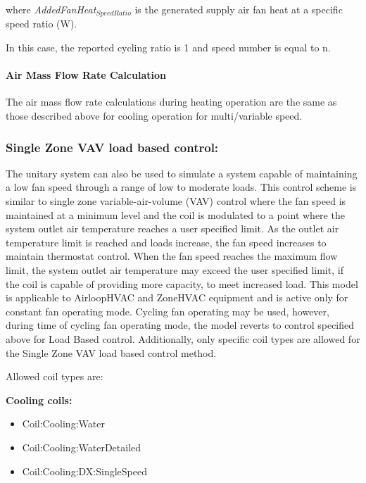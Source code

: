 where \emph{AddedFanHeat\(_{SpeedRatio}\)} is the generated supply air fan heat at a specific speed ratio (W).

In this case, the reported cycling ratio is 1 and speed number is equal to n.

\paragraph{Air Mass Flow Rate Calculation}\label{air-mass-flow-rate-calculation-1}

The air mass flow rate calculations during heating operation are the same as those described above for cooling operation for multi/variable speed.

\subsubsection{Single Zone VAV load based control:}\label{ashrae-901-load-based-control}

The unitary system can also be used to simulate a system capable of maintaining a low fan speed through a range of low to moderate loads. This control scheme is similar to single zone variable-air-volume (VAV) control where the fan speed is maintained at a minimum level and the coil is modulated to a point where the system outlet air temperature reaches a user specified limit. As the outlet air temperature limit is reached and loads increase, the fan speed increases to maintain thermostat control. When the fan speed reaches the maximum flow limit, the system outlet air temperature may exceed the user specified limit, if the coil is capable of providing more capacity, to meet increased load. This model is applicable to AirloopHVAC and ZoneHVAC equipment and is active only for constant fan operating mode. Cycling fan operating may be used, however, during time of cycling fan operating mode, the model reverts to control specified above for Load Based control. Additionally, only specific coil types are allowed for the Single Zone VAV load based control method. 

Allowed coil types are:

\textbf{Cooling coils:}
\begin{itemize}
\item Coil:Cooling:Water
\item Coil:Cooling:WaterDetailed
\item Coil:Cooling:DX:SingleSpeed
\end{itemize}

